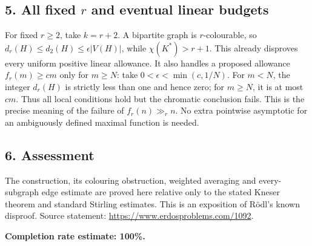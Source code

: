 \subsection*{5. All fixed $r$ and eventual linear budgets}
For fixed $r\ge2$, take $k=r+2$. A bipartite graph is $r$-colourable, so $d_r(H)\le d_2(H)\le\epsilon|V(H)|$, while $\chi(K^*)>r+1$. This already disproves every uniform positive linear allowance.
It also handles a proposed allowance $f_r(m)\ge cm$ only for $m\ge N$: take $0<\epsilon<\min(c,1/N)$. For $m<N$, the integer $d_r(H)$ is strictly less than one and hence zero; for $m\ge N$, it is at most $cm$. Thus all local conditions hold but the chromatic conclusion fails. This is the precise meaning of the failure of $f_r(n)\gg_r n$. No extra pointwise asymptotic for an ambiguously defined maximal function is needed.

\subsection*{6. Assessment}
The construction, its colouring obstruction, weighted averaging and every-subgraph edge estimate are proved here relative only to the stated Kneser theorem and standard Stirling estimates. This is an exposition of R\"odl's known disproof. Source statement: \url{https://www.erdosproblems.com/1092}.

\textbf{Completion rate estimate: 100\%.}
